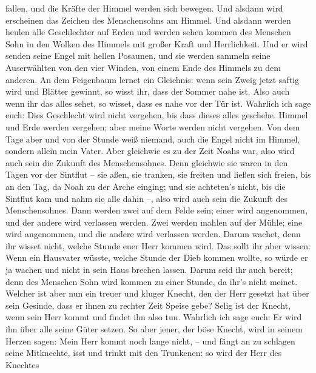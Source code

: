 fallen, und die Kräfte der Himmel werden sich bewegen.  Und
alsdann wird erscheinen das Zeichen des Menschensohns am Himmel. Und
alsdann werden heulen alle Geschlechter auf Erden und werden sehen
kommen des Menschen Sohn in den Wolken des Himmels mit großer Kraft und
Herrlichkeit.  Und er wird senden seine Engel mit hellen
Posaunen, und sie werden sammeln seine Auserwählten von den vier Winden,
von einem Ende des Himmels zu dem anderen.  An dem
Feigenbaum lernet ein Gleichnis: wenn sein Zweig jetzt saftig wird und
Blätter gewinnt, so wisst ihr, dass der Sommer nahe ist. 
Also auch wenn ihr das alles sehet, so wisset, dass es nahe vor der Tür
ist.  Wahrlich ich sage euch: Dies Geschlecht wird nicht
vergehen, bis dass dieses alles geschehe.  Himmel und Erde
werden vergehen; aber meine Worte werden nicht vergehen. 
Von dem Tage aber und von der Stunde weiß niemand, auch die Engel nicht
im Himmel, sondern allein mein Vater.  Aber gleichwie es zu
der Zeit Noahs war, also wird auch sein die Zukunft des Menschensohnes.
 Denn gleichwie sie waren in den Tagen vor der Sintflut --
sie aßen, sie tranken, sie freiten und ließen sich freien, bis an den
Tag, da Noah zu der Arche einging;  und sie achteten's
nicht, bis die Sintflut kam und nahm sie alle dahin --, also wird auch
sein die Zukunft des Menschensohnes.  Dann werden zwei auf
dem Felde sein; einer wird angenommen, und der andere wird verlassen
werden.  Zwei werden mahlen auf der Mühle; eine wird
angenommen, und die andere wird verlassen werden.  Darum
wachet, denn ihr wisset nicht, welche Stunde euer Herr kommen wird.
 Das sollt ihr aber wissen: Wenn ein Hausvater wüsste,
welche Stunde der Dieb kommen wollte, so würde er ja wachen und nicht in
sein Haus brechen lassen.  Darum seid ihr auch bereit; denn
des Menschen Sohn wird kommen zu einer Stunde, da ihr's nicht meinet.
 Welcher ist aber nun ein treuer und kluger Knecht, den der
Herr gesetzt hat über sein Gesinde, dass er ihnen zu rechter Zeit Speise
gebe?  Selig ist der Knecht, wenn sein Herr kommt und
findet ihn also tun.  Wahrlich ich sage euch: Er wird ihn
über alle seine Güter setzen.  So aber jener, der böse
Knecht, wird in seinem Herzen sagen: Mein Herr kommt noch lange nicht,
--  und fängt an zu schlagen seine Mitknechte, isst und
trinkt mit den Trunkenen:  so wird der Herr des Knechtes
